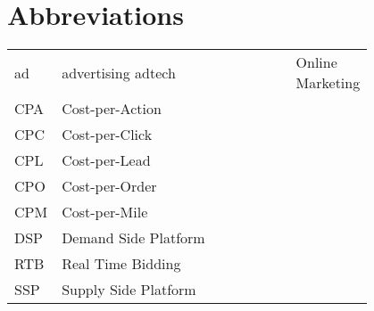 \chapter*{Abbreviations}

\begin{flushleft}
\begin{tabular}{l p{0.8\linewidth}}
ad    & advertising
adtech   & Online Marketing\\
CPA   & Cost-per-Action\\
CPC   & Cost-per-Click\\
CPL   & Cost-per-Lead\\
CPO   & Cost-per-Order\\
CPM   & Cost-per-Mile\\
DSP   & Demand Side Platform\\
RTB   & Real Time Bidding\\
SSP   & Supply Side Platform\\
\end{tabular}
\end{flushleft}

